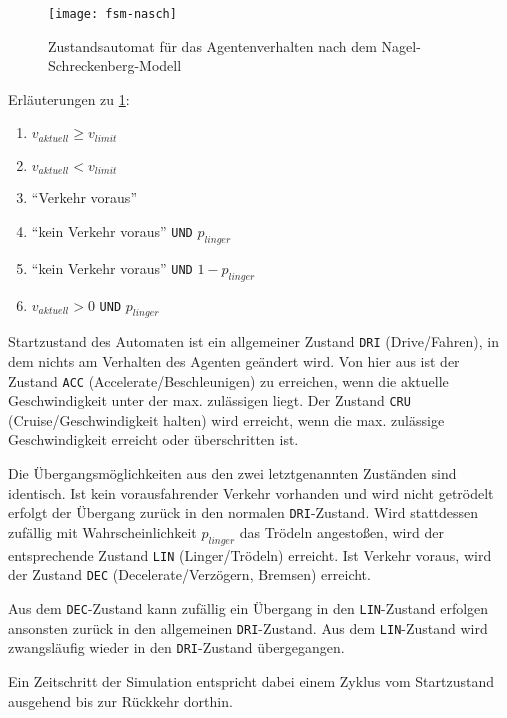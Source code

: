 \begin{figure}[hptb]
 \centering
 \texttt{[image: fsm-nasch]}
 \caption[Zustandsautomat für das Agentenverhalten]
 		{Zustandsautomat für das Agentenverhalten nach dem Nagel-Schreckenberg-Modell}
 \label{figure:fsm-nasch}
\end{figure}

\noindent
Erläuterungen zu \cref{figure:fsm-nasch}:
\begin{enumerate}
\itemsep0em
	\item  $ v_{aktuell}  \geq  v_{limit} $
	\item  $ v_{aktuell}  <  v_{limit} $
	\item  \enquote{Verkehr voraus}
	\item  \enquote{kein Verkehr voraus} \texttt{UND} $ p_{linger} $
	\item  \enquote{kein Verkehr voraus} \texttt{UND} $ 1 - p_{linger} $
	\item  $ v_{aktuell}  > 0 $ \texttt{UND} $ p_{linger} $
\end{enumerate}

Startzustand des Automaten ist ein allgemeiner Zustand \texttt{DRI} (Drive/Fahren), in dem nichts am Verhalten des Agenten geändert wird.
Von hier aus ist der Zustand \texttt{ACC} (Accelerate/Beschleunigen) zu erreichen, wenn die aktuelle Geschwindigkeit unter der max. zulässigen liegt. 
Der Zustand \texttt{CRU} (Cruise/Geschwindigkeit halten) wird erreicht, wenn die max. zulässige Geschwindigkeit erreicht oder überschritten ist.

Die Übergangsmöglichkeiten aus den zwei letztgenannten Zuständen sind identisch. 
Ist kein vorausfahrender Verkehr vorhanden und wird nicht getrödelt erfolgt der Übergang zurück in den normalen \texttt{DRI}-Zustand.
Wird stattdessen zufällig mit Wahrscheinlichkeit $ p_{linger} $ das Trödeln angestoßen, wird der entsprechende Zustand \texttt{LIN} (Linger/Trödeln) erreicht.
Ist Verkehr voraus, wird der Zustand \texttt{DEC} (Decelerate/Verzögern, Bremsen) erreicht.

Aus dem \texttt{DEC}-Zustand kann zufällig ein Übergang in den \texttt{LIN}-Zustand erfolgen ansonsten zurück in den allgemeinen \texttt{DRI}-Zustand.
Aus dem \texttt{LIN}-Zustand wird zwangsläufig wieder in den \texttt{DRI}-Zustand übergegangen.

Ein Zeitschritt der Simulation entspricht dabei einem Zyklus vom Startzustand ausgehend bis zur Rückkehr dorthin.



